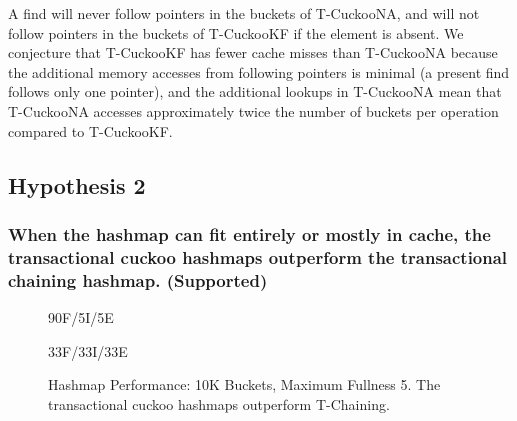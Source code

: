 A find will never follow pointers in the buckets of T-CuckooNA, and will not follow pointers in the buckets of T-CuckooKF if the element is absent. We conjecture that T-CuckooKF has fewer cache misses than T-CuckooNA because the additional memory accesses from following pointers is minimal (a present find follows only one pointer), and the additional lookups in T-CuckooNA mean that T-CuckooNA accesses approximately twice the number of buckets per operation compared to T-CuckooKF.

\vspace{12pt}
\noindent{}

\subsection{Hypothesis 2}
\subsubsection{When the hashmap can fit entirely or mostly in cache, the transactional cuckoo hashmaps outperform the transactional chaining hashmap. (Supported)}

\begin{figure}[H]
    \centering
    \begin{minipage}{0.7\textwidth}
	\caption*{90F/5I/5E}
        \vspace{12pt}
    \end{minipage}
    \begin{minipage}{0.7\textwidth}
	\caption*{33F/33I/33E}
    \end{minipage}
    \caption[Hashmap Performance: 10K Buckets, Maximum Fullness 5]{Hashmap Performance: 10K Buckets, Maximum Fullness 5. The transactional cuckoo hashmaps outperform T-Chaining.}
    \label{fig:hm_5}
\end{figure}


